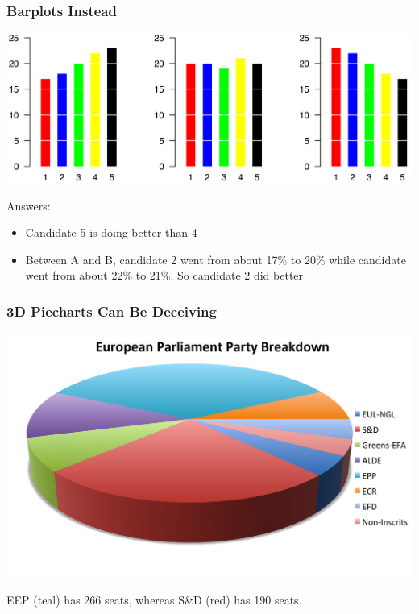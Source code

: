 \documentclass[handout]{beamer}
\begin{document}
\begin{frame}[fragile]
\frametitle{Barplots Instead}

\begin{center}
\includegraphics[width=\textwidth]{figure/barplots.png}
\end{center}

\vspace{0.5cm}

\pause Answers:
\begin{itemize}
\item Candidate 5 is doing better than 4
\item Between A and B, candidate 2 went from about 17\% to 20\% while candidate went from about 22\% to 21\%.  So candidate 2 did better
\end{itemize}

\end{frame}


\begin{frame}[fragile]
\frametitle{3D Piecharts Can Be Deceiving}

\begin{center}
\includegraphics[width=\textwidth]{figure/europe.png}
\end{center}

EEP (teal) has 266 seats, whereas S\&D (red) has 190 seats.  


\end{frame}
\end{document}
